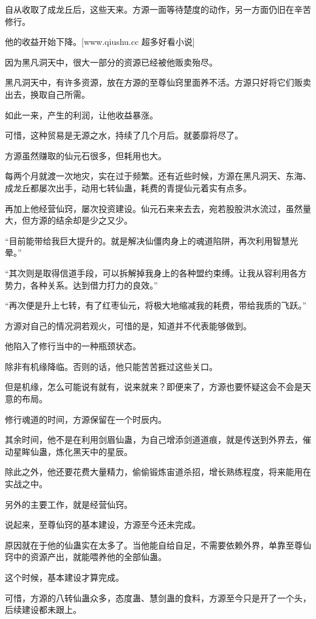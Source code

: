 \begin{this_body}
自从收取了成龙丘后，这些天来。方源一面等待楚度的动作，另一方面仍旧在辛苦修行。

他的收益开始下降。[www.qiushu.cc 超多好看小说]

因为黑凡洞天中，很大一部分的资源已经被他贩卖殆尽。

黑凡洞天中，有许多资源，放在方源的至尊仙窍里面养不活。方源只好将它们贩卖出去，换取自己所需。

如此一来，产生的利润，让他收益暴涨。

可惜，这种贸易是无源之水，持续了几个月后。就萎靡将尽了。

方源虽然赚取的仙元石很多，但耗用也大。

每两个月就渡一次地灾，实在过于频繁。还有近些时候，方源在黑凡洞天、东海、成龙丘都屡次出手，动用七转仙蛊，耗费的青提仙元着实有点多。

再加上他经营仙窍，屡次投资建设。仙元石来来去去，宛若股股洪水流过，虽然量大，但方源的结余却是少之又少。

“目前能带给我巨大提升的。就是解决仙僵肉身上的魂道陷阱，再次利用智慧光晕。”

“其次则是取得信道手段，可以拆解掉我身上的各种盟约束缚。让我从容利用各方势力，各种关系。达到借力打力的良效。”

“再次便是升上七转，有了红枣仙元，将极大地缩减我的耗费，带给我质的飞跃。”

方源对自己的情况洞若观火，可惜的是，知道并不代表能够做到。

他陷入了修行当中的一种瓶颈状态。

除非有机缘降临。否则的话，他只能苦苦捱过这些关口。

但是机缘，怎么可能说有就有，说来就来？即便来了，方源也要怀疑这会不会是天意的布局。

修行魂道的时间，方源保留在一个时辰内。

其余时间，他不是在利用剑眉仙蛊，为自己增添剑道道痕，就是传送到外界去，催动星眸仙蛊，炼化黑天中的星辰。

除此之外，他还要花费大量精力，偷偷锻炼宙道杀招，增长熟练程度，将来能用在实战之中。

另外的主要工作，就是经营仙窍。

说起来，至尊仙窍的基本建设，方源至今还未完成。

原因就在于他的仙蛊实在太多了。当他能自给自足，不需要依赖外界，单靠至尊仙窍中的资源产出，就能喂养他的全部仙蛊。

这个时候，基本建设才算完成。

可惜，方源的八转仙蛊众多，态度蛊、慧剑蛊的食料，方源至今只是开了一个头，后续建设都未跟上。


\end{this_body}
